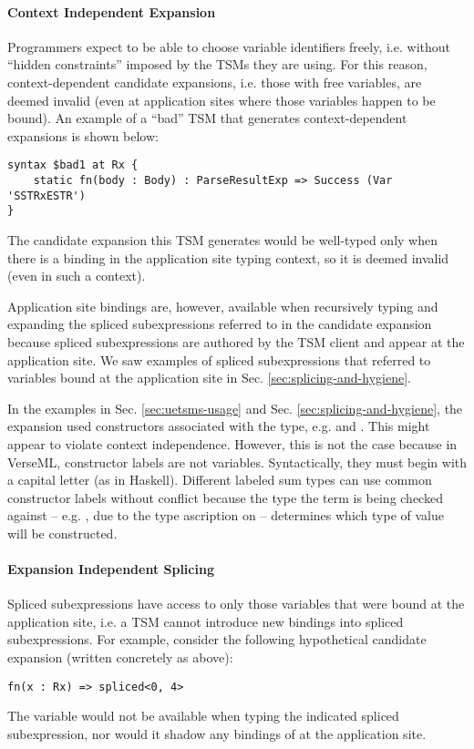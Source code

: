 \paragraph{Context Independent Expansion} Programmers expect to be able to choose variable identifiers freely, i.e. without ``hidden constraints'' imposed by the TSMs they are using. For this reason, context-dependent candidate expansions, i.e. those with free variables, are deemed invalid (even at application sites where those variables happen to be bound). An example of a ``bad'' TSM that generates context-dependent expansions is shown below:
\begin{lstlisting}[numbers=none]
syntax $bad1 at Rx {
	static fn(body : Body) : ParseResultExp => Success (Var 'SSTRxESTR')
}
\end{lstlisting}
The candidate expansion this TSM generates would be well-typed only when there is a binding  in the application site typing context, so it is deemed invalid (even in such a context). 

Application site bindings are, however, available when recursively typing and expanding the spliced subexpressions referred to in the candidate expansion because spliced subexpressions are authored by the TSM client and appear at the application site. We saw examples of spliced subexpressions that referred to variables bound at the application site in Sec. \ref{sec:splicing-and-hygiene}.%

In the examples in Sec. \ref{sec:uetsms-usage} and Sec. \ref{sec:splicing-and-hygiene}, the expansion used constructors associated with the  type, e.g.  and . This might appear to violate context independence. However, this is not the case because in VerseML, constructor labels are not variables. Syntactically, they must begin with a capital letter (as in Haskell). Different labeled sum types can use common constructor labels without conflict because the type the term is being checked against -- e.g. , due to the type ascription on  -- determines which type of value will be constructed.%

\paragraph{Expansion Independent Splicing} Spliced subexpressions have access to only those variables that were bound at the application site, i.e. a TSM cannot introduce new bindings into spliced subexpressions. For example, consider the following hypothetical candidate expansion (written concretely as above):
\begin{lstlisting}[numbers=none]
fn(x : Rx) => spliced<0, 4>
\end{lstlisting}
The variable  would not be available when typing the indicated spliced subexpression, nor would it shadow any bindings of  at the application site.


